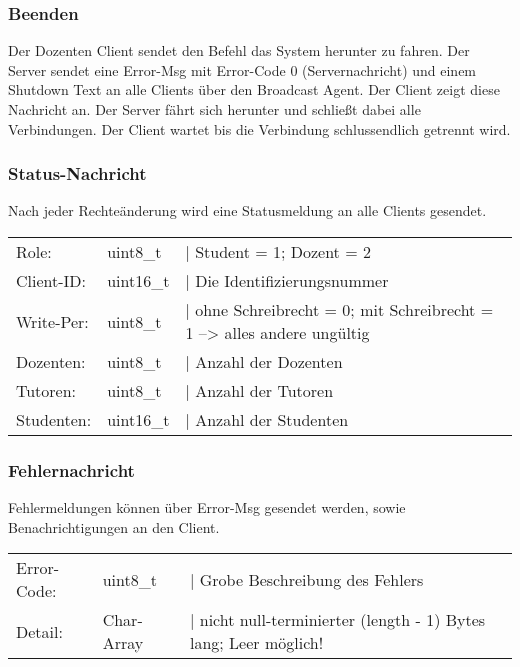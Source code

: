 \subsubsection{Beenden}
Der Dozenten Client sendet den Befehl das System herunter zu fahren. Der Server sendet eine Error-Msg 
mit Error-Code 0 (Servernachricht) und einem Shutdown Text an alle Clients über den Broadcast Agent. 
Der Client zeigt diese Nachricht an. Der Server fährt sich herunter und schließt dabei alle 
Verbindungen. Der Client wartet bis die Verbindung schlussendlich getrennt wird.


\subsubsection{Status-Nachricht}
Nach jeder Rechteänderung wird eine Statusmeldung an alle Clients gesendet.

\begin{tabular}{lll}
Role: & uint8\_t & | Student = 1; Dozent = 2 \\
Client-ID: & uint16\_t & | Die Identifizierungsnummer \\
Write-Per: & uint8\_t & | ohne Schreibrecht = 0; mit Schreibrecht = 1 --> alles andere ungültig \\
Dozenten: & uint8\_t & | Anzahl der Dozenten \\
Tutoren: & uint8\_t & | Anzahl der Tutoren \\
Studenten: & uint16\_t & | Anzahl der Studenten
\end{tabular}

\subsubsection{Fehlernachricht}
Fehlermeldungen können über Error-Msg gesendet werden, sowie Benachrichtigungen an den Client.

\begin{tabular}{lll}
Error-Code: & uint8\_t & | Grobe Beschreibung des Fehlers\\
Detail: & Char-Array & | nicht null-terminierter (length - 1) Bytes lang; Leer möglich!
\end{tabular}